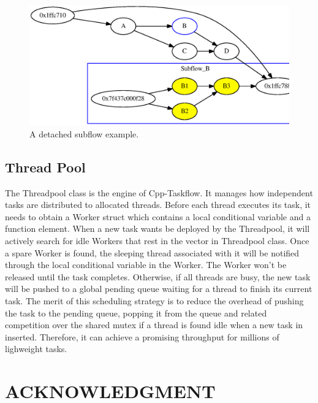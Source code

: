 \documentclass[sigconf]{acmart}
\begin{document}
\begin{figure}[htb]
 \centering
 \includegraphics[width=1.0\columnwidth]{Fig/detach.eps}
  \caption{
    A detached subflow example.
  }
 \label{fig::detach}
\end{figure}

\subsection{Thread Pool}

  The Threadpool class is the engine of Cpp-Taskflow. It manages how independent tasks are distributed to
allocated threads. Before each thread executes its task, it needs to obtain a Worker struct which contains 
a local conditional variable and a function element. When a new task wants be deployed by the Threadpool, it
 will actively search for idle Workers that rest in the vector in Threadpool class. Once a spare Worker is found, 
the sleeping thread associated with it will be notified through the local conditional variable in the Worker. The Worker
won't be released until the task completes. Otherwise, if all threads are busy, 
the new task will be pushed to a global pending queue waiting for a thread to finish its current task. The merit of 
this scheduling strategy is to reduce the overhead of pushing the task to the pending queue, popping it from the queue and related competition 
over the shared mutex
if a thread is found idle when a new task in inserted. Therefore, it can achieve a promising throughput for millions of lighweight tasks. 

\section{ACKNOWLEDGMENT}




%
%


\end{document}
